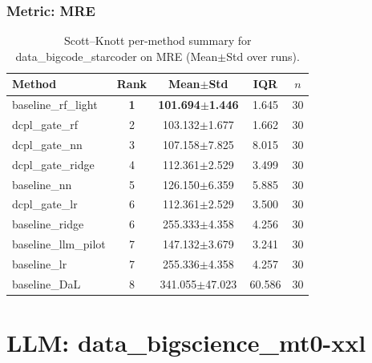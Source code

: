 \subsubsection*{Metric: MRE}
\begin{table}[H]
\centering
\scriptsize
\setlength{\tabcolsep}{4pt}
\renewcommand{\arraystretch}{1.1}
\caption{Scott--Knott per-method summary for data\_bigcode\_starcoder on MRE (Mean$\pm$Std over runs).}
\label{tab:sk_data_bigcode_starcoder_MRE}
\begin{tabular}{l|c|c|c|c}
\hline
\textbf{Method} & \textbf{Rank} & \textbf{Mean$\pm$Std} & \textbf{IQR} & \textbf{$n$} \\
\hline
\rowcolor{red!15} baseline\_rf\_light & \textbf{1} & \textbf{101.694$\pm$1.446} & 1.645 & 30 \\
dcpl\_gate\_rf & 2 & 103.132$\pm$1.677 & 1.662 & 30 \\
dcpl\_gate\_nn & 3 & 107.158$\pm$7.825 & 8.015 & 30 \\
dcpl\_gate\_ridge & 4 & 112.361$\pm$2.529 & 3.499 & 30 \\
baseline\_nn & 5 & 126.150$\pm$6.359 & 5.885 & 30 \\
dcpl\_gate\_lr & 6 & 112.361$\pm$2.529 & 3.500 & 30 \\
baseline\_ridge & 6 & 255.333$\pm$4.358 & 4.256 & 30 \\
baseline\_llm\_pilot & 7 & 147.132$\pm$3.679 & 3.241 & 30 \\
baseline\_lr & 7 & 255.336$\pm$4.358 & 4.257 & 30 \\
baseline\_DaL & 8 & 341.055$\pm$47.023 & 60.586 & 30 \\
\hline
\end{tabular}
\end{table}


\newpage

\section*{LLM: data\_bigscience\_mt0-xxl}

